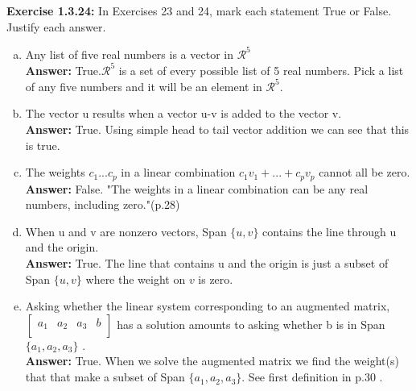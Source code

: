 \documentclass{amsart}
\begin{document}
\vspace{1in}



\noindent\textbf{Exercise 1.3.24: }
In Exercises 23 and 24, mark each statement True or False. Justify each answer.\\

\begin{enumerate}[(a)]
\item Any list of five real numbers is a vector in $\mathcal{R}^5$\\

\noindent \textbf{Answer: }
True.$\mathcal{R}^5$ is a set of every possible list of 5 real numbers. Pick a list of any five numbers and it will be an element in $\mathcal{R}^5$.
\vspace{1in}

\item The vector u results when a vector u-v is added to the vector v.\\

\noindent \textbf{Answer: }
True. Using simple head to tail vector addition we can see that this is true.
\vspace{1in}

\item The weights $c_{1}...c_{p}$ in a linear combination $c_{1}v_{1}+...+c_{p}v_{p}$ cannot all be zero. \\

\noindent \textbf{Answer: }
False. "The weights in a linear combination can be any real numbers, including zero."(p.28)

\vspace{1in}

\item When u and v are nonzero vectors, Span $\{u,v\}$ contains
the line through u and the origin. \\

\noindent \textbf{Answer: }
True. The line that contains u and the origin is just a subset of Span $\{u,v\}$ where the weight on $v$ is zero.
\vspace{1in}


\item Asking whether the linear system corresponding to an augmented matrix, $\begin{bmatrix} a_{1}&a_{2}&a_{3}&b\\ \end{bmatrix}$ has a solution amounts to asking whether b is in Span $\{a_{1},a_{2},a_{3}\}$ .\\

\noindent \textbf{Answer: }
True. When we solve the augmented matrix we find the weight(s) that that make a subset of Span $\{a_{1},a_{2},a_{3}\}$. See first definition in p.30 .

\vspace{1in}




\end{enumerate}
\end{document}
